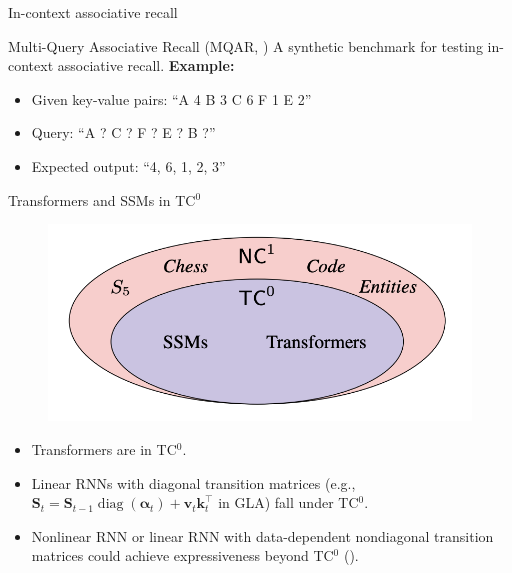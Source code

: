 \begin{frame}{In-context associative recall}
    \begin{block}{\scriptsize Multi-Query Associative Recall (MQAR, \cite{zoology})}
        \scriptsize
        A synthetic benchmark for testing in-context associative recall.
        \vspace{1mm}
        \textbf{Example:}
        \begin{itemize}
            \item Given key-value pairs: ``A 4 B 3 C 6 F 1 E 2''
            \item Query: ``A ? C ? F ? E ? B ?''  
            \item Expected output: ``4, 6, 1, 2, 3''
        \end{itemize}
    \end{block}
    \vspace{-1mm}
    
\end{frame}


\begin{frame}{Transformers and SSMs in TC$^0$}
    \begin{figure}
        \centering
        \includegraphics[width=.45\linewidth]{figure/tc0.png}
    \end{figure}
    \vspace{-2mm}
\begin{itemize}
    \item Transformers are in TC$^0$.
    \item Linear RNNs with {\color{red}diagonal transition matrices} (e.g., $\mathbf{S}_t = \mathbf{S}_{t-1} \operatorname{diag}(\boldsymbol{\alpha}_t) + \mathbf{v}_t \mathbf{k}_t^\top$ in GLA) fall under TC$^0$.
    \item {\color{red} Nonlinear RNN} or linear RNN with {\color{red} data-dependent nondiagonal transition matrices} could achieve expressiveness beyond TC$^0$ (\cite{Merrill2024TheIO}).
\end{itemize}
\end{frame}

